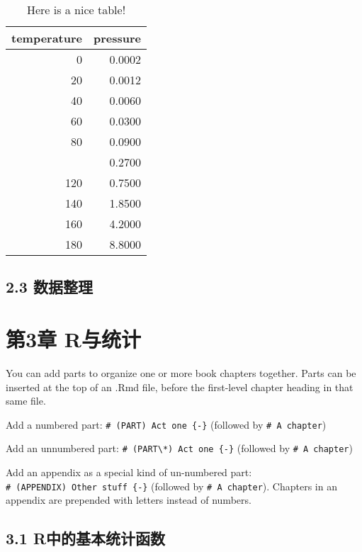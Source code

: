 \documentclass[
]{book}
\theoremstyle{definition}
\theoremstyle{definition}
\theoremstyle{definition}
\theoremstyle{definition}
\theoremstyle{remark}
\begin{document}
\begin{table}

\caption{\label{tab:nice-tab}Here is a nice table!}
\centering
\begin{tabular}[t]{rr}
\toprule
temperature & pressure\\
\midrule
0 & 0.0002\\
20 & 0.0012\\
40 & 0.0060\\
60 & 0.0300\\
80 & 0.0900\\
\addlinespace
100 & 0.2700\\
120 & 0.7500\\
140 & 1.8500\\
160 & 4.2000\\
180 & 8.8000\\
\bottomrule
\end{tabular}
\end{table}

\hypertarget{ux6570ux636eux6574ux7406}{%
\section*{2.3 数据整理}\label{ux6570ux636eux6574ux7406}}

\hypertarget{ux7b2c3ux7ae0-rux4e0eux7edfux8ba1}{%
\chapter*{第3章 R与统计}\label{ux7b2c3ux7ae0-rux4e0eux7edfux8ba1}}

You can add parts to organize one or more book chapters together. Parts can be inserted at the top of an .Rmd file, before the first-level chapter heading in that same file.

Add a numbered part: \texttt{\#\ (PART)\ Act\ one\ \{-\}} (followed by \texttt{\#\ A\ chapter})

Add an unnumbered part: \texttt{\#\ (PART\textbackslash{}*)\ Act\ one\ \{-\}} (followed by \texttt{\#\ A\ chapter})

Add an appendix as a special kind of un-numbered part: \texttt{\#\ (APPENDIX)\ Other\ stuff\ \{-\}} (followed by \texttt{\#\ A\ chapter}). Chapters in an appendix are prepended with letters instead of numbers.

\hypertarget{rux4e2dux7684ux57faux672cux7edfux8ba1ux51fdux6570}{%
\section*{3.1 R中的基本统计函数}\label{rux4e2dux7684ux57faux672cux7edfux8ba1ux51fdux6570}}
\end{document}
